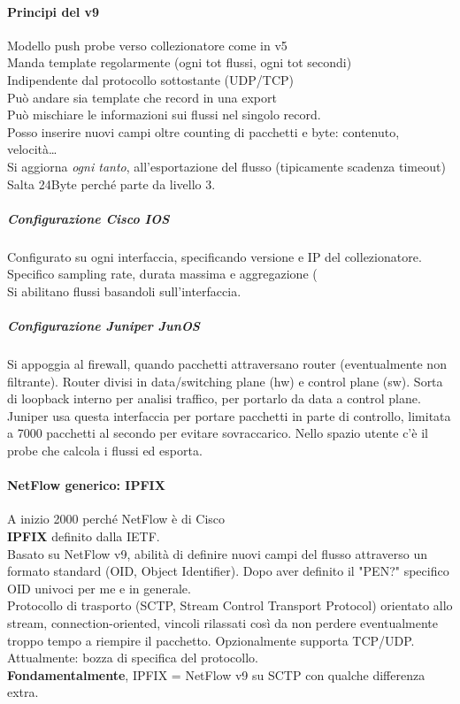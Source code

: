 \documentclass[10pt]{book}
\begin{document}
\paragraph{Principi del v9} Modello push probe verso collezionatore come in v5\\
Manda template regolarmente (ogni tot flussi, ogni tot secondi)\\
Indipendente dal protocollo sottostante (UDP/TCP)\\
Può andare sia template che record in una export\\
Può mischiare le informazioni sui flussi nel singolo record.\\
Posso inserire nuovi campi oltre counting di pacchetti e byte: contenuto, velocità\ldots\\
Si aggiorna \textit{ogni tanto}, all'esportazione del flusso (tipicamente scadenza timeout)\\
Salta 24Byte perché parte da livello 3.
\subparagraph{Configurazione Cisco IOS} Configurato su ogni interfaccia, specificando versione e IP del collezionatore. Specifico sampling rate, durata massima e aggregazione (\\
Si abilitano flussi basandoli sull'interfaccia.
\subparagraph{Configurazione Juniper JunOS} Si appoggia al firewall, quando pacchetti attraversano router (eventualmente non filtrante). Router divisi in data/switching plane (hw) e control plane (sw). Sorta di loopback interno per analisi traffico, per portarlo da data a control plane. Juniper usa questa interfaccia per portare pacchetti in parte di controllo, limitata a 7000 pacchetti al secondo per evitare sovraccarico. Nello spazio utente c'è il probe che calcola i flussi ed esporta.
\paragraph{NetFlow generico: IPFIX} A inizio 2000 perché NetFlow è di Cisco\\
\textbf{IPFIX} definito dalla IETF.\\
Basato su NetFlow v9, abilità di definire nuovi campi del flusso attraverso un formato standard (OID, Object Identifier). Dopo aver definito il "PEN?" specifico OID univoci per me e in generale.\\
Protocollo di trasporto (SCTP, Stream Control Transport Protocol) orientato allo stream, connection-oriented, vincoli rilassati così da non perdere eventualmente troppo tempo a riempire il pacchetto. Opzionalmente supporta TCP/UDP.\\
Attualmente: bozza di specifica del protocollo.\\
\textbf{Fondamentalmente}, IPFIX = NetFlow v9 su SCTP con qualche differenza extra.
\end{document}
